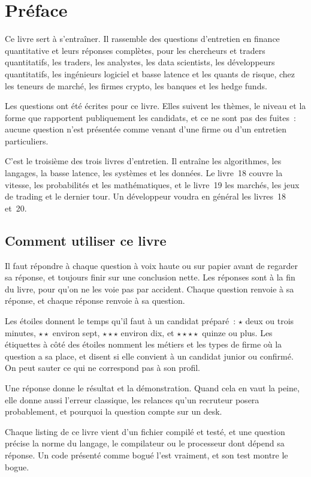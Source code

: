 \chapter{Préface}

Ce livre sert à s'entraîner. Il rassemble des questions d'entretien en finance quantitative et leurs réponses
complètes, pour les chercheurs et traders quantitatifs, les traders, les analystes, les data scientists, les
développeurs quantitatifs, les ingénieurs logiciel et basse latence et les quants de risque, chez les teneurs de
marché, les firmes crypto, les banques et les hedge funds.

Les questions ont été écrites pour ce livre. Elles suivent les thèmes, le niveau et la forme que rapportent
publiquement les candidats, et ce ne sont pas des fuites~: aucune question n'est présentée comme venant d'une firme ou
d'un entretien particuliers.

C'est le troisième des trois livres d'entretien. Il entraîne les algorithmes, les langages, la basse latence, les
systèmes et les données. Le livre~18 couvre la vitesse, les probabilités et les mathématiques, et le livre~19 les
marchés, les jeux de trading et le dernier tour. Un développeur voudra en général les livres~18 et~20.

\section*{Comment utiliser ce livre}

Il faut répondre à chaque question à voix haute ou sur papier avant de regarder sa réponse, et toujours finir sur une
conclusion nette. Les réponses sont à la fin du livre, pour qu'on ne les voie pas par accident. Chaque question renvoie
à sa réponse, et chaque réponse renvoie à sa question.

Les étoiles donnent le temps qu'il faut à un candidat préparé~: $\star$ deux ou trois minutes, $\star\star$ environ
sept, $\star\star\star$ environ dix, et $\star\star\star\star$ quinze ou plus. Les étiquettes à côté des étoiles
nomment les métiers et les types de firme où la question a sa place, et disent si elle convient à un candidat junior
ou confirmé. On peut sauter ce qui ne correspond pas à son profil.

Une réponse donne le résultat et la démonstration. Quand cela en vaut la peine, elle donne aussi l'erreur classique,
les relances qu'un recruteur posera probablement, et pourquoi la question compte sur un desk.

Chaque listing de ce livre vient d'un fichier compilé et testé, et une question précise la norme du langage, le
compilateur ou le processeur dont dépend sa réponse. Un code présenté comme bogué l'est vraiment, et son test montre
le bogue.

